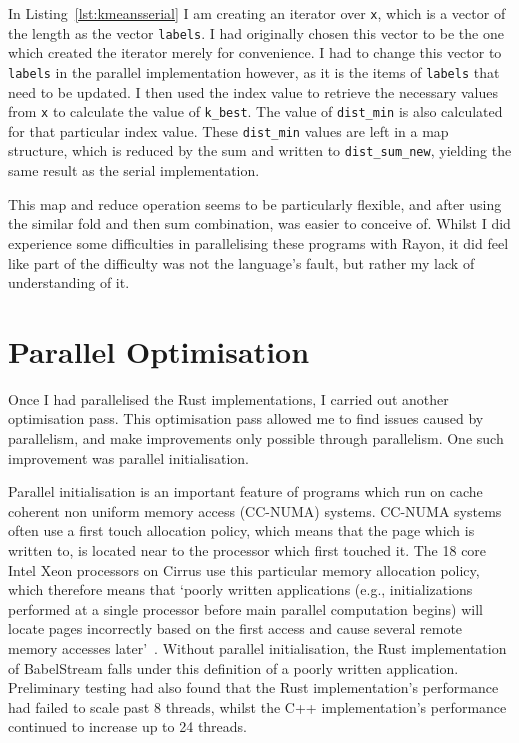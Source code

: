 In Listing~\ref{lst:kmeansserial} I am creating an iterator over \texttt{x}, which is a vector of the length as the vector \texttt{labels}. I had originally chosen this vector to be the one which created the iterator merely for convenience. I had to change this vector to \texttt{labels} in the parallel implementation however, as it is the items of \texttt{labels} that need to be updated. I then used the index value to retrieve the necessary values from \texttt{x} to calculate the value of \texttt{k\_best}. The value of \texttt{dist\_min} is also calculated for that particular index value. These \texttt{dist\_min} values are left in a map structure, which is reduced by the sum and written to \texttt{dist\_sum\_new}, yielding the same result as the serial implementation. 

This map and reduce operation seems to be particularly flexible, and after using the similar fold and then sum combination, was easier to conceive of. Whilst I did experience some difficulties in parallelising these programs with Rayon, it did feel like part of the difficulty was not the language's fault, but rather my lack of understanding of it.


\section{Parallel Optimisation}
Once I had parallelised the Rust implementations, I carried out another optimisation pass. This optimisation pass allowed me to find issues caused by parallelism, and make improvements only possible through parallelism. One such improvement was parallel initialisation.

Parallel initialisation is an important feature of programs which run on cache coherent non uniform memory access (CC-NUMA) systems. CC-NUMA systems often use a first touch allocation policy, which means that the page which is written to, is located near to the processor which first touched it. The 18 core Intel Xeon processors on Cirrus use this particular memory allocation policy, which therefore means that `poorly written applications (e.g., initializations  performed  at  a  single  processor  before  main  parallel computation  begins)  will  locate  pages  incorrectly based  on  the  first  access  and  cause  several  remote memory accesses later'~\cite{Bhuyan:2000}. Without parallel initialisation, the Rust implementation of BabelStream falls under this definition of a poorly written application. Preliminary testing had also found that the Rust implementation's performance had failed to scale past 8 threads, whilst the C++ implementation's performance continued to increase up to 24 threads. 


